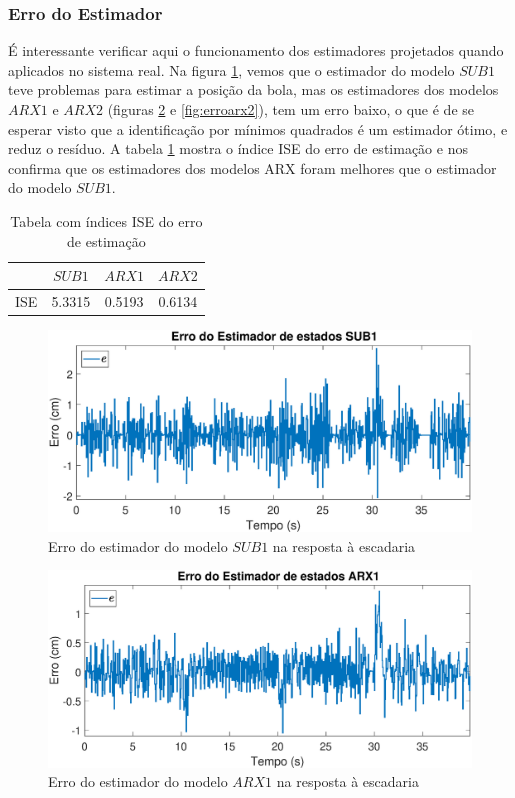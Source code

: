 \subsubsection{Erro do Estimador} \label{erroest}
 É interessante verificar aqui o funcionamento dos estimadores projetados quando aplicados no sistema real. Na figura \ref{fig:errosub1}, vemos que o estimador do modelo $SUB1$ teve problemas para estimar a posição da bola, mas os estimadores dos modelos $ARX1$ e $ARX2$ (figuras \ref{fig:erroarx1} e \ref{fig:erroarx2}), tem um erro baixo, o que é de se esperar visto que a identificação por mínimos quadrados é um estimador ótimo, e reduz o resíduo. A tabela \ref{tb:iseestim} mostra o índice ISE do erro de estimação e nos confirma que os estimadores dos modelos ARX foram melhores que o estimador do modelo $SUB1$.
 
 \begin{table}[htb]
 	\centering
 	\begin{tabular}{|c|c|c|c|}
 		\hline 
 		& $SUB1$ & $ARX1$ & $ARX2$ \\ 
 		\hline 
 		ISE & 5.3315 & 0.5193 & 0.6134 \\ 
 		\hline 
 	\end{tabular} 
 \caption{Tabela com índices ISE do erro de estimação}
 \label{tb:iseestim}
 \end{table}
 
 
\begin{figure}[htb]
	\centering
	\includegraphics[width=1\linewidth]{errosub1}
	\caption[Erro do estimador do modelo $SUB1$ na resposta à escadaria]{Erro do estimador do modelo $SUB1$ na resposta à escadaria}
	\label{fig:errosub1}
\end{figure}

\begin{figure}[htb]
	\centering
	\includegraphics[width=1\linewidth]{erroarx1}
	\caption[Erro do estimador do modelo $ARX1$ na resposta à escadaria]{Erro do estimador do modelo $ARX1$ na resposta à escadaria}
	\label{fig:erroarx1}
\end{figure}

